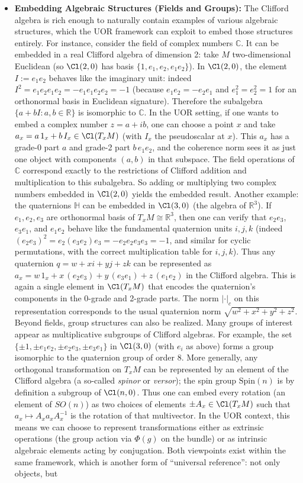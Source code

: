 \documentclass[12pt]{article}
\begin{document}
\begin{itemize}
    \item \textbf{Embedding Algebraic Structures (Fields and Groups):} The Clifford algebra is rich enough to naturally contain examples of various algebraic structures, which the UOR framework can exploit to embed those structures entirely. For instance, consider the field of complex numbers $\mathbb{C}$. It can be embedded in a real Clifford algebra of dimension 2: take $M$ two-dimensional Euclidean (so $\Cl(2,0)$ has basis $\{1, e_1, e_2, e_1 e_2\}$). In $\Cl(2,0)$, the element $I := e_1 e_2$ behaves like the imaginary unit: indeed $I^2 = e_1 e_2 e_1 e_2 = - e_1 e_1 e_2 e_2 = -1$ (because $e_1 e_2 = - e_2 e_1$ and $e_1^2 = e_2^2 = 1$ for an orthonormal basis in Euclidean signature). Therefore the subalgebra $\{a + bI : a,b \in \mathbb{R}\}$ is isomorphic to $\mathbb{C}$. In the UOR setting, if one wants to embed a complex number $z = a + ib$, one can choose a point $x$ and take $a_x = a\,1_x + b\,I_x \in \Cl(T_xM)$ (with $I_x$ the pseudoscalar at $x$). This $a_x$ has a grade-0 part $a$ and grade-2 part $b\,e_1 e_2$, and the coherence norm sees it as just one object with components $(a, b)$ in that subspace. The field operations of $\mathbb{C}$ correspond exactly to the restrictions of Clifford addition and multiplication to this subalgebra. So adding or multiplying two complex numbers embedded in $\Cl(2,0)$ yields the embedded result. Another example: the quaternions $\mathbb{H}$ can be embedded in $\Cl(3,0)$ (the algebra of $\mathbb{R}^3$). If $e_1, e_2, e_3$ are orthonormal basis of $T_xM \cong \mathbb{R}^3$, then one can verify that $e_2 e_3$, $e_3 e_1$, and $e_1 e_2$ behave like the fundamental quaternion units $i,j,k$ (indeed $(e_2 e_3)^2 = e_2 (e_3 e_2) e_3 = - e_2 e_2 e_3 e_3 = -1$, and similar for cyclic permutations, with the correct multiplication table for $i,j,k$). Thus any quaternion $q = w + x i + y j + z k$ can be represented as $a_x = w\,1_x + x\,(e_2 e_3) + y\,(e_3 e_1) + z\,(e_1 e_2)$ in the Clifford algebra. This is again a single element in $\Cl(T_xM)$ that encodes the quaternion’s components in the 0-grade and 2-grade parts. The norm $|\cdot|_c$ on this representation corresponds to the usual quaternion norm $\sqrt{w^2+x^2+y^2+z^2}$. Beyond fields, group structures can also be realized. Many groups of interest appear as multiplicative subgroups of Clifford algebras. For example, the set $\{\pm 1, \pm e_1 e_2, \pm e_2 e_3, \pm e_3 e_1\}$ in $\Cl(3,0)$ (with $e_i$ as above) forms a group isomorphic to the quaternion group of order 8. More generally, any orthogonal transformation on $T_xM$ can be represented by an element of the Clifford algebra (a so-called \emph{spinor} or \emph{versor}); the spin group $\mathrm{Spin}(n)$ is by definition a subgroup of $\Cl(n,0)$. Thus one can embed every rotation (an element of $SO(n)$) as two choices of elements $\pm A_x \in \Cl(T_xM)$ such that $a_x \mapsto A_x a_x A_x^{-1}$ is the rotation of that multivector. In the UOR context, this means we can choose to represent transformations either as extrinsic operations (the group action via $\Phi(g)$ on the bundle) or as intrinsic algebraic elements acting by conjugation. Both viewpoints exist within the same framework, which is another form of “universal reference”: not only objects, but 
\end{itemize}
\end{document}
